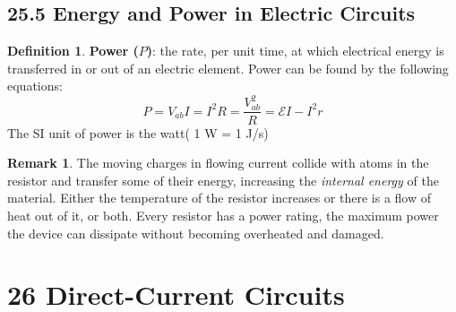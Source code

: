 \documentclass[12pt]{amsart}
\theoremstyle{definition}
\newtheorem{definition}{Definition} %
\newtheorem*{remark}{Remark}        %
\numberwithin{equation}{theorem}    %
\begin{document}
\subsection*{25.5 Energy and Power in Electric Circuits}

\begin{definition}
    \textbf{Power ($P$)}:
    the rate, per unit time, at which electrical energy is transferred in or out of
    an electric element. Power can be found by the following equations:
    $$ P = V_{ab}I = I^2R = \frac{V_{ab}^2}{R} = \mathcal{E}I-I^2r $$
    The SI unit of power is the watt( 1 W = 1 J/s)
    \begin{remark}
        The moving charges in flowing current collide with atoms in the resistor and transfer 
        some of their energy, increasing the \textit{internal energy} of the material. 
        Either the temperature of the resistor increases or there is a flow of heat out of it, or both.  
        Every resistor has a power rating, the maximum power the device can 
        dissipate without becoming overheated and damaged.
    \end{remark}

\end{definition}

\section*{26 Direct-Current Circuits}
\end{document}
